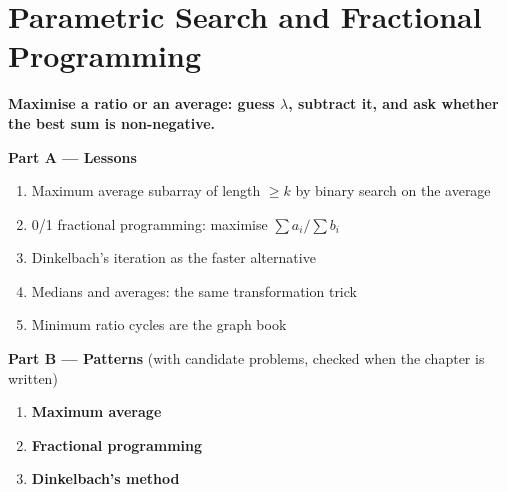 \chapter{Parametric Search and Fractional Programming}
\label{ch:parametric}

\begin{tcolorbox}[enhanced, colback=white, colframe=secondaryblue, boxrule=1pt, arc=2mm]
\textbf{\large\textcolor{primaryblue}{Maximise a ratio or an average: guess $\lambda$, subtract it, and ask whether the best sum is non-negative.}}
\end{tcolorbox}


\begin{plannedbox}
\textbf{Part A --- Lessons}
\begin{enumerate}[leftmargin=*, label=\textbf{A\arabic*.}, itemsep=1pt]
    \item Maximum average subarray of length $\ge k$ by binary search on the average
    \item 0/1 fractional programming: maximise $\sum a_i / \sum b_i$
    \item Dinkelbach's iteration as the faster alternative
    \item Medians and averages: the same transformation trick
    \item Minimum ratio cycles are the graph book
\end{enumerate}
\textbf{Part B --- Patterns} (with candidate problems, checked when the chapter is written)
\begin{enumerate}[leftmargin=*, label=\textbf{P\arabic*.}, itemsep=1pt]
    \item \textbf{Maximum average}
    \item \textbf{Fractional programming}
    \item \textbf{Dinkelbach's method}
\end{enumerate}
\end{plannedbox}
